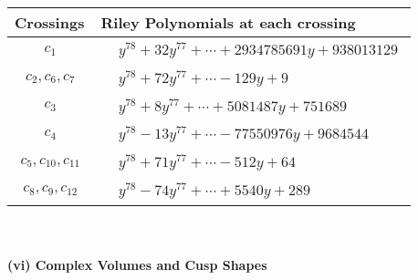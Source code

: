 \documentclass[1p]{elsarticle_modified}
\theoremstyle{definition}
\begin{document}
\begin{tabular}{m{50pt}|m{274pt}}
Crossings & \hspace{64pt}Riley Polynomials at each crossing \\
\hline $$\begin{aligned}c_{1}\end{aligned}$$&$\begin{aligned}
&y^{78}+32 y^{77}+\cdots+2934785691 y+938013129
\end{aligned}$\\
\hline $$\begin{aligned}c_{2},c_{6},c_{7}\end{aligned}$$&$\begin{aligned}
&y^{78}+72 y^{77}+\cdots-129 y+9
\end{aligned}$\\
\hline $$\begin{aligned}c_{3}\end{aligned}$$&$\begin{aligned}
&y^{78}+8 y^{77}+\cdots+5081487 y+751689
\end{aligned}$\\
\hline $$\begin{aligned}c_{4}\end{aligned}$$&$\begin{aligned}
&y^{78}-13 y^{77}+\cdots-77550976 y+9684544
\end{aligned}$\\
\hline $$\begin{aligned}c_{5},c_{10},c_{11}\end{aligned}$$&$\begin{aligned}
&y^{78}+71 y^{77}+\cdots-512 y+64
\end{aligned}$\\
\hline $$\begin{aligned}c_{8},c_{9},c_{12}\end{aligned}$$&$\begin{aligned}
&y^{78}-74 y^{77}+\cdots+5540 y+289
\end{aligned}$\\
\hline
\end{tabular}\\~\\
\newpage\flushleft \textbf{(vi) Complex Volumes and Cusp Shapes}
\end{document}
